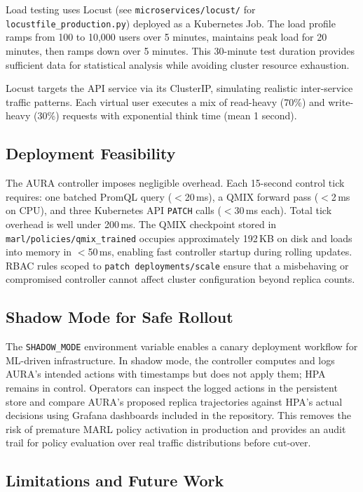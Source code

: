 \documentclass[conference]{IEEEtran}
\begin{document}
Load testing uses Locust (see \texttt{microservices/locust/} for
\texttt{locustfile\_production.py}) deployed as a Kubernetes Job.
The load profile ramps from 100 to 10,000 users over 5 minutes,
maintains peak load for 20 minutes, then ramps down over 5 minutes.
This 30-minute test duration provides sufficient data for statistical
analysis while avoiding cluster resource exhaustion.

Locust targets the API service via its ClusterIP, simulating realistic
inter-service traffic patterns. Each virtual user executes a mix of
read-heavy (70\%) and write-heavy (30\%) requests with exponential
think time (mean 1 second).


\subsection{Deployment Feasibility}

The AURA controller imposes negligible overhead. Each 15-second
control tick requires: one batched PromQL query ($<$20\,ms),
a QMIX forward pass ($<$2\,ms on CPU), and three Kubernetes API
\texttt{PATCH} calls ($<$30\,ms each). Total tick overhead is well
under 200\,ms. The QMIX checkpoint stored in
\texttt{marl/policies/qmix\_trained} occupies approximately 192\,KB
on disk and loads into memory in $<$50\,ms, enabling fast controller
startup during rolling updates. RBAC rules scoped to
\texttt{patch deployments/scale} ensure that a misbehaving or
compromised controller cannot affect cluster configuration beyond
replica counts.

\subsection{Shadow Mode for Safe Rollout}

The \texttt{SHADOW\_MODE} environment variable enables a canary
deployment workflow for ML-driven infrastructure. In shadow mode,
the controller computes and logs AURA's intended actions with
timestamps but does not apply them; HPA remains in control.
Operators can inspect the logged actions in the persistent store
and compare AURA's proposed replica trajectories against HPA's
actual decisions using Grafana dashboards included in the
repository. This removes the risk of premature MARL policy
activation in production and provides an audit trail for policy
evaluation over real traffic distributions before cut-over.

\subsection{Limitations and Future Work}
\end{document}
